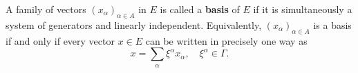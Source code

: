 A family of vectors $(x_\alpha)_{\alpha \in A}$ in $E$ is called a \textbf{basis} of $E$ if it is simultaneously a system of generators and linearly independent. Equivalently, $(x_\alpha)_{\alpha \in A}$ is a basis if and only if every vector $x \in E$ can be written in precisely one way as
$$x = \sum_\alpha \xi^\alpha x_\alpha, \quad \xi^\alpha \in \Gamma.$$
